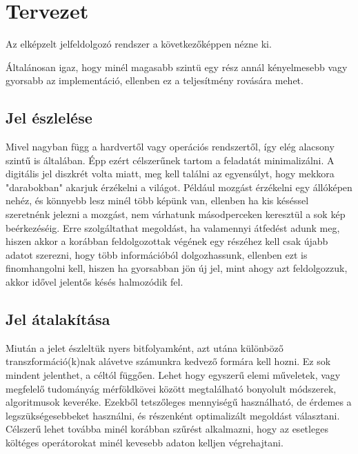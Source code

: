 
\section{Tervezet}

Az elk\'epzelt jelfeldolgoz\'o rendszer a k\"ovetkez\H ok\'eppen n\'ezne ki. 

\'Altal\'anosan igaz, hogy min\'el magasabb szint\"u egy r\'esz ann\'al k\'enyelmesebb vagy gyorsabb az implement\'aci\'o, ellenben ez a teljes\'itm\'eny rov\'as\'ara mehet. 

\subsection{Jel \'eszlel\'ese} 
Mivel nagyban f\"ugg a hardvert\H ol vagy oper\'aci\'os rendszert\H ol, \'igy el\'eg alacsony szint\H u is \'altal\'aban. 
\'Epp ez\'ert c\'elszer\H unek tartom a feladat\'at minimaliz\'alni.
A digit\'alis jel diszkr\'et volta miatt, meg kell tal\'alni az egyens\'ulyt, hogy mekkora "darabokban" akarjuk \'erz\'ekelni a vil\'agot. P\'eld\'aul mozg\'ast \'erz\'ekelni egy \'all\'ok\'epen neh\'ez, \'es k\"onnyebb lesz min\'el t\"obb k\'ep\"unk van, ellenben ha kis k\'es\'essel szeretn\'enk jelezni a mozg\'ast, nem v\'arhatunk m\'asodperceken kereszt\"ul a sok k\'ep be\'erkez\'es\'eig. 
Erre szolg\'altathat megold\'ast, ha valamennyi \'atfed\'est adunk meg, hiszen akkor a kor\'abban feldolgozottak v\'eg\'enek egy r\'esz\'ehez kell csak \'ujabb adatot szerezni, hogy t\"obb inform\'aci\'ob\'ol dolgozhassunk, ellenben ezt is finomhangolni kell, hiszen ha gyorsabban j\"on \'uj jel, mint ahogy azt feldolgozzuk, akkor id\H ovel jelent\H os k\'es\'es halmoz\'odik fel.

\subsection{Jel \'atalak\'it\'asa}
Miut\'an a jelet \'eszlelt\"uk nyers bitfolyamk\'ent, azt ut\'ana k\"ul\"onb\"oz\H o transzform\'aci\'o(k)nak al\'avetve sz\'amunkra kedvez\H o form\'ara kell hozni. Ez sok mindent jelenthet, a c\'elt\'ol f\"ugg\H oen. Lehet hogy egyszer\H u elemi m\H uveletek, vagy  megfelel\H o tudom\'any\'ag m\'erf\"oldk\"ovei k\"oz\"ott megtal\'alhat\'o bonyolult m\'odszerek, algoritmusok kever\'eke.
Ezekb\H ol tetsz\H oleges mennyis\'eg\H u haszn\'alhat\'o, de \'erdemes a legsz\"uks\'egesebbeket haszn\'alni, \'es r\'eszenk\'ent optimaliz\'alt megold\'ast v\'alasztani. 
C\'elszer\H u lehet tov\'abba min\'el kor\'abban sz\H ur\'est alkalmazni, hogy az esetleges k\"olt\'eges oper\'atorokat min\'el kevesebb adaton kelljen v\'egrehajtani.

